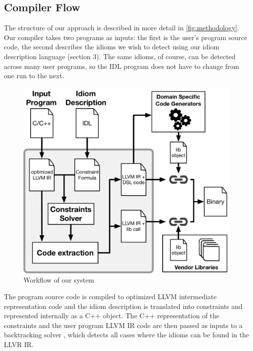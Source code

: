 \subsection{Compiler Flow}

    The structure of our approach is described in more detail in
    \autoref{fig:methodology}.
    Our compiler takes two programs as inputs: the first is the user's program
    source code, the second describes the idioms we wish to detect using our
    idiom description language (section 3).
    The same idioms, of course, can be detected across many user programs, so
    the IDL program does not have to change from one run to the next.

\begin{figure}[t]
    \centering
    \includegraphics[width=\linewidth]{figures/compiler_flow.pdf}
    \caption{Workflow of our system}
    \label{fig:methodology}
    \vspace{-0.5em}
\end{figure}

    The program source code is compiled to optimized LLVM intermediate
    representation code and the idiom description is translated into constraints
    and represented internally as a C++ object.
    The C++ representation of the constraints and the user program LLVM IR code
    are then passed as inputs to a backtracking solver
    \cite{ginsbach2017discovery}, which detects all cases where the idioms can
    be found in the LLVR IR.

